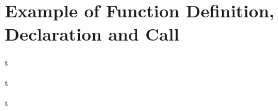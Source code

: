 \documentclass[../lecture4-functions.tex]{subfiles}
\begin{document}
\section{Example of Function Definition, Declaration and Call}


\begin{frame}[fragile]{}
t
\end{frame}


\begin{frame}[fragile]{}
t
\end{frame}


\begin{frame}[fragile]{}
t
\end{frame}

\end{document}
